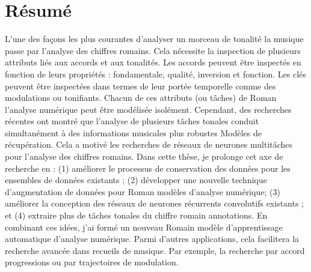 \chapter*{R\'esum\'e}
\label{chap:abstract-fr}


L'une des façons les plus courantes d'analyser un morceau de
tonalité la musique passe par l'analyse des chiffres
romains. Cela nécessite la inspection de plusieurs attributs
liés aux accords et aux tonalités. Les accords peuvent être
inspectés en fonction de leurs propriétés : fondamentale,
qualité, inversion et fonction. Les clés peuvent être
inspectées dans termes de leur portée temporelle comme des
modulations ou tonifiants. Chacun de ces attributs (ou
tâches) de Roman l'analyse numérique peut être modélisée
isolément. Cependant, des recherches récentes ont montré que
l'analyse de plusieurs tâches tonales conduit simultanément
à des informations musicales plus robustes Modèles de
récupération. Cela a motivé les recherches de réseaux de
neurones multitâches pour l'analyse des chiffres romains.
Dans cette thèse, je prolonge cet axe de recherche en : (1)
améliorer le processus de conservation des données pour les
ensembles de données existants ; (2) développer une nouvelle
technique d'augmentation de données pour Roman modèles
d'analyse numérique; (3) améliorer la conception des réseaux
de neurones récurrents convolutifs existants ; et (4)
extraire plus de tâches tonales du chiffre romain
annotations. En combinant ces idées, j'ai formé un nouveau
Romain modèle d'apprentissage automatique d'analyse
numérique. Parmi d'autres applications, cela facilitera la
recherche avancée dans recueils de musique. Par exemple, la
recherche par accord progressions ou par trajectoires de
modulation.
